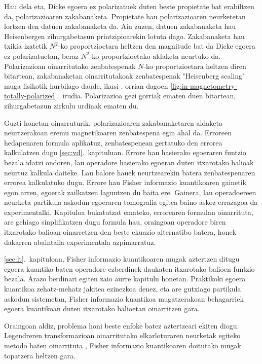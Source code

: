 Hau dela eta, Dicke egoera ez polarizatuek duten beste propietate bat erabiltzen da, polarizazioaren zakabanaketa.
Propietate hau polarizazioaren neurketetan lortzen den datuen zakabanaketa da.
Ain zuzen, datuen zakabanaketa hau Heisenbergen zihurgabetasun printzipioarekin lotuta dago.
Zakabanaketa hau txikia izatetik $N^2$-ko proportzioetara heltzen den magnitude bat da Dicke egoera ez polarizatuetan, beraz $N^2$-ko proportzioetako aldaketa neurtuko da.
Polarizazioan oinarritutako zenbatespenak $N$-ko proportzioetara heltzen diren bitartean, zakabanaketan oinarritutakoak zenbatespenak "Heisenberg scaling" muga fisikotik hurbilago daude, ikusi \pageref{fig:in-magnetometry-totally-polarized}. orrian dagoen \ref{fig:in-magnetometry-totally-polarized}.~irudia.
Polarizazioa gezi gorriak ematen duen bitartean, zihurgabetazun zirkulu urdinak ematen du.

Guzti honetan oinarruturik, polarizazioaren zakabanaketaren aldaketa neurtzerakoan eremu magnetikoaren zenbatespena egin ahal da.
Erroreen hedapenaren formula aplikatuz, zenbatespenean gertatuko den errorea kalkulatzen dugu \ref{sec:vd}.~kapituluan.
Errore hau hasierako egoeraren funtzio bezala idatzi ondoren, lau operadore hasierako egoeran duten itxarotako balioak neurtuz kalkula daiteke.
Lau balore hauek neurtzearekin batera zenbatespenaren errorea kalkulatuko dugu.
Errore hau Fisher informazio kuantikoaren gainetik egon arren, egoerak zailkatzen laguntzen du baita ere.
Gainera, lau operadoereen neurketa partikula askodun egoeraren tomografia egitea baino askoz errazagoa da experimentalki.
Kapituloa bukatutzat emateko, errorearen formulan oinarrituta, are gehiago sinplifikatzen dugu formula hau, oraingoan operadore biren itxarotako balioan oinarretzen den beste ekuazio alternatibo batera, honek dakarren abaintaila experimentala azpimarratuz.

\ref{sec:lt}.~kapituloan, Fisher informazio kuantikoaren mugak aztertzen ditugu egoera kuantiko baten operadore ezberdinek daukaten itxarotako balioen funtzio bezala.
Arazo berdinari egiten zaio aurre kapitulu honetan.
Praktikoki egoera kuantikoa zehatz-mehatz jakitea ezinezkoa denez, eta are gutxiago partikula askodun sistemetan, Fisher informazio kuantikoa mugatzerakoan behagarriek egoera kuantikoan duten itxarotako balioetan oinarritzen gara.

Oraingoan aldiz, problema honi beste enfoke batez aztertzeari ekiten diogu.
Legendreren transformazioan oinarritutako elkarloturaren neurketak egiteko metodo baten oinarrituta \cite{Guehne2007}, Fisher informazio kuantikoaren doitutako mugak topatzera heltzen gara.

